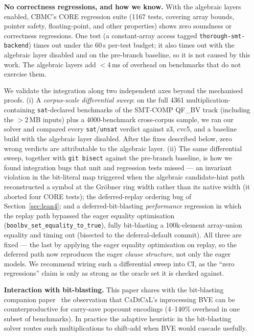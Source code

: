 \documentclass[runningheads]{llncs}
\newcommand{\cadical}{\textsc{CaDiCaL}\xspace}
\newcommand{\cbmc}{\textsc{CBMC}\xspace}
\begin{document}
\textbf{No correctness regressions, and how we know.} With the
algebraic layers enabled, \cbmc's CORE regression suite (1167
tests, covering array bounds, pointer safety, floating-point, and
other properties) shows zero soundness or correctness
regressions. One test (a constant-array access tagged
\texttt{thorough-smt-backend}) times out under the 60\,s per-test
budget; it also times out with the algebraic layer disabled and
on the pre-branch baseline, so it is not caused by this work. The
algebraic layers add $<$4\,ms of overhead on benchmarks that do
not exercise them.

We validate the integration along two independent axes beyond the
mechanised proofs. (i) A \emph{corpus-scale differential sweep}:
on the full 4361 multiplication-containing \texttt{sat}-declared
benchmarks of the SMT-COMP QF\_BV track (including the
$>$2\,MB inputs) plus a 4000-benchmark cross-corpus sample, we
ran our solver and compared every \texttt{sat}/\texttt{unsat}
verdict against z3, cvc5, and a baseline build with the algebraic
layer disabled. After the fixes described below, zero wrong
verdicts are attributable to the algebraic layer. (ii) The same
differential sweep, together with \texttt{git bisect} against the
pre-branch baseline, is how we found integration bugs that unit
and regression tests missed --- an invariant
violation in the bit-literal map triggered when the algebraic
candidate-hint path reconstructed a symbol at the Gr\"obner ring
width rather than its native width (it aborted four CORE tests);
the deferred-replay ordering bug of Section~\ref{sec:lean4}; and a
deferred-bit-blasting \emph{performance} regression in which the
replay path bypassed the eager equality optimisation
(\texttt{boolbv\_set\_equality\_to\_true}), fully bit-blasting a
100k-element array-union equality and timing out (bisected to the
deferral-default commit). All three are fixed --- the last by
applying the eager equality optimisation on replay, so the
deferred path now reproduces the eager \emph{clause structure},
not only the eager models. We recommend wiring such a
differential sweep into CI, as the ``zero regressions'' claim is
only as strong as the oracle set it is checked against.

\textbf{Interaction with bit-blasting.} This paper shares with the
bit-blasting companion paper~\cite{companion-bitblasting} the
observation that \cadical's
inprocessing BVE can be counterproductive for carry-save popcount
encodings (4--140\% overhead in one subset of benchmarks). In
practice the adaptive heuristic in the bit-blasting solver routes
such multiplications to shift-add when BVE would cascade
usefully.
\end{document}
